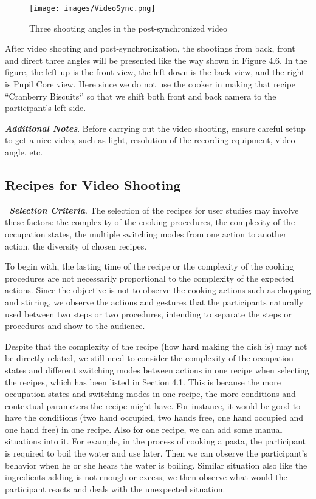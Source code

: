 \documentclass[fyp]{socreport}
\begin{document}
\begin{figure}[H]
\caption{Three shooting angles in the post-synchronized video}
\centering
\texttt{[image: images/VideoSync.png]}
\end{figure}

After video shooting and post-synchronization, the shootings from back, front and direct three angles will be presented like the way shown in Figure 4.6. In the figure, the left up is the front view, the left down is the back view, and the right is Pupil Core view. Here since we do not use the cooker in making that recipe ``Cranberry Biscuits‘’ so that we shift both front and back camera to the participant's left side.

\textbf{\textit{Additional Notes}}. Before carrying out the video shooting, ensure careful setup to get a nice video, such as light, resolution of the recording equipment, video angle, etc.

\subsection{Recipes for Video Shooting}
\quad\, \textbf{\textit{Selection Criteria}}. The selection of the recipes for user studies may involve these factors: the complexity of the cooking procedures, the complexity of the occupation states, the multiple switching modes from one action to another action, the diversity of chosen recipes.

To begin with, the lasting time of the recipe or the complexity of the cooking procedures are not necessarily proportional to the complexity of the expected actions. Since the objective is not to observe the cooking actions such as chopping and stirring, we observe the actions and gestures that the participants naturally used between two steps or two procedures, intending to separate the steps or procedures and show to the audience.

Despite that the complexity of the recipe (how hard making the dish is) may not be directly related, we still need to consider the complexity of the occupation states and different switching modes between actions in one recipe when selecting the recipes, which has been listed in Section 4.1. This is because the more occupation states and switching modes in one recipe, the more conditions and contextual parameters the recipe might have. For instance, it would be good to have the conditions (two hand occupied, two hands free, one hand occupied and one hand free) in one recipe. Also for one recipe, we can add some manual situations into it. For example, in the process of cooking a pasta, the participant is required to boil the water and use later. Then we can observe the participant's behavior when he or she hears the water is boiling. Similar situation also like the ingredients adding is not enough or excess, we then observe what would the participant reacts and deals with the unexpected situation.
\end{document}
